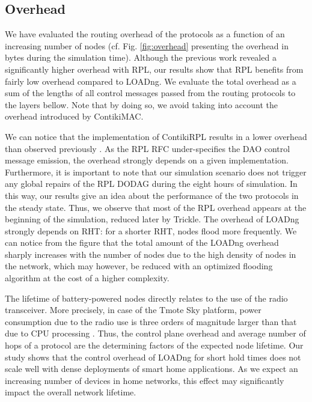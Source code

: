 \documentclass[conference,10pt,a4paper]{IEEEtran}
\begin{document}
\vspace{-0.2cm}\subsection{Overhead}
\label{overhead}

We have evaluated the routing overhead of the protocols as a function
of an increasing number of nodes (cf. Fig. \ref{fig:overhead}
presenting the overhead in bytes during the simulation time).
Although the previous work
\cite{rpl-load-clausen-paper} revealed a significantly higher 
overhead with RPL, our results show that RPL benefits from fairly low overhead
compared to LOADng. We evaluate the total overhead as a sum of the lengths of all control messages passed from the routing protocols to the layers bellow. Note that by doing so, we avoid taking into account the overhead introduced by ContikiMAC.



We can notice that the implementation of ContikiRPL results in a
lower overhead than observed previously \cite{rpl-load-clausen-paper}. 
As the RPL RFC under-specifies the DAO control message emission, the
overhead strongly depends on a given implementation. Furthermore, it is
important to note that our simulation scenario does not trigger any global
repairs of the RPL DODAG during the eight hours of simulation. 
In this way, our results give an idea about the performance of the two protocols
in the steady state. 
Thus, we observe that most of the RPL overhead appears at the beginning of
the simulation, reduced later by Trickle. 
The overhead of LOADng strongly depends on RHT: for a shorter RHT, nodes flood
more frequently. We can notice from the figure that the 
total amount of the LOADng overhead sharply increases with the number of nodes
due to the high density of nodes in the network, which  may however, be reduced
with an optimized flooding algorithm at the cost of a higher complexity.

The lifetime of battery-powered nodes  directly relates to the use of the
radio transceiver. More precisely, in case of the Tmote Sky platform, power
consumption due to the radio use is three orders of magnitude larger than that
due to  CPU processing \cite{tmote-sky}. Thus, the control plane
overhead and average number of hops of a protocol are the determining factors of
the expected node lifetime. Our study shows that the control overhead of LOADng
for short hold times does not scale well with dense deployments of smart home
applications. As 
we expect an increasing number of devices in home networks, this effect may
significantly impact the overall network lifetime.  
\end{document}
